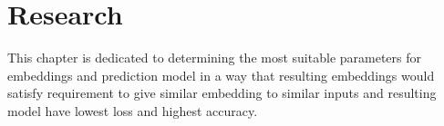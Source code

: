 
\chapter{Research} \label{chap:research}

This chapter is dedicated to determining the most suitable parameters for embeddings and prediction model in a way that resulting embeddings would satisfy requirement to give similar embedding to similar inputs and resulting model have lowest loss and highest accuracy. 






